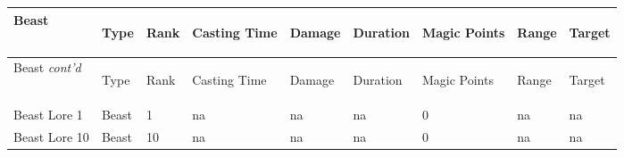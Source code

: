 \documentclass[twoside]{book}
\begin{document}
\begin{longtable}{p{1.25in}lp{2em}p{3em}llp{7em}ll} 
  Beast& \begin{turn}{70}{Type}\end{turn}
          & \begin{turn}{70}{Rank}\end{turn}
          & \begin{turn}{70}{Casting Time}\end{turn}
          & \begin{turn}{70}{Damage}\end{turn}
          & \begin{turn}{70}{Duration}\end{turn}
          & \begin{turn}{70}{Magic Points}\end{turn}
          & \begin{turn}{70}{Range}\end{turn}
          & \begin{turn}{70}{Target}\end{turn}
          \\
  \hline
  \hline
  \endfirsthead
  Beast \textit{cont'd}
        & \begin{turn}{70}{Type}\end{turn}
          & \begin{turn}{70}{Rank}\end{turn}
          & \begin{turn}{70}{Casting Time}\end{turn}
          & \begin{turn}{70}{Damage}\end{turn}
          & \begin{turn}{70}{Duration}\end{turn}
          & \begin{turn}{70}{Magic Points}\end{turn}
          & \begin{turn}{70}{Range}\end{turn}
          & \begin{turn}{70}{Target}\end{turn}
           \\
  \hline
  \endhead
\raggedright Beast Lore 1 & Beast & 1 &
           na & na
           & na
           & 0
           & na
           & na
           \tabularnewline
      \raggedright Beast Lore 10 & Beast & 10 &
           na & na
           & na
           & 0
           & na
           & na

\end{longtable}
\end{document}
